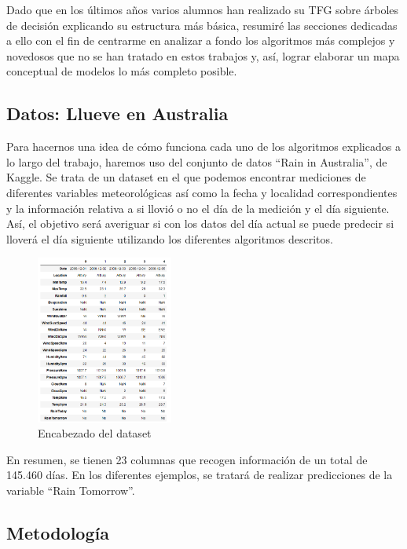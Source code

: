 \documentclass[12pt,twoside]{article}
\begin{document}
Dado que en los últimos años varios alumnos han realizado su TFG sobre árboles de decisión explicando su estructura más básica, resumiré las secciones dedicadas a ello con el fin de centrarme en analizar a fondo los algoritmos más complejos y novedosos que no se han tratado en estos trabajos y, así, lograr elaborar un mapa conceptual de modelos lo más completo posible.



\subsection{Datos: Llueve en Australia} \label{sec: subsec11}

Para hacernos una idea de cómo funciona cada uno de los algoritmos explicados a lo largo del trabajo, haremos uso del conjunto de datos ``Rain in Australia'', de Kaggle. Se trata de un dataset en el que podemos encontrar mediciones de diferentes variables meteorológicas así como la fecha y localidad correspondientes y la información relativa a si llovió o no el día de la medición y el día siguiente. Así, el objetivo será averiguar si con los datos del día actual se puede predecir si lloverá el día siguiente utilizando los diferentes algoritmos descritos. 
\begin{figure}[h]
	\centering
	\includegraphics[width = 0.4\textwidth]{Intro_01}
	\caption{Encabezado del dataset}
\end{figure}

En resumen, se tienen 23 columnas que recogen información de un total de 145.460 días. En los diferentes ejemplos, se tratará de realizar predicciones de la variable ``Rain Tomorrow''.


\subsection{Metodología} \label{subsec:Metodología}
\end{document}
